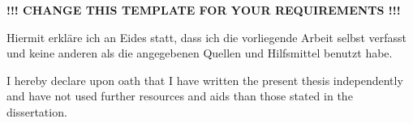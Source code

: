 %
%
\color{red}
\begin{center}
\bf !!! CHANGE THIS TEMPLATE FOR YOUR REQUIREMENTS !!!
\end{center}
%
%
\par\noindent Hiermit erkläre ich an Eides statt, dass ich die vorliegende Arbeit selbst verfasst und keine anderen als die angegebenen Quellen und Hilfsmittel benutzt habe.
%
\vspace*{2em}%
%
\par\noindent I hereby declare upon oath that I have written the present thesis independently and have not used further resources and aids than those stated in the dissertation.
%
